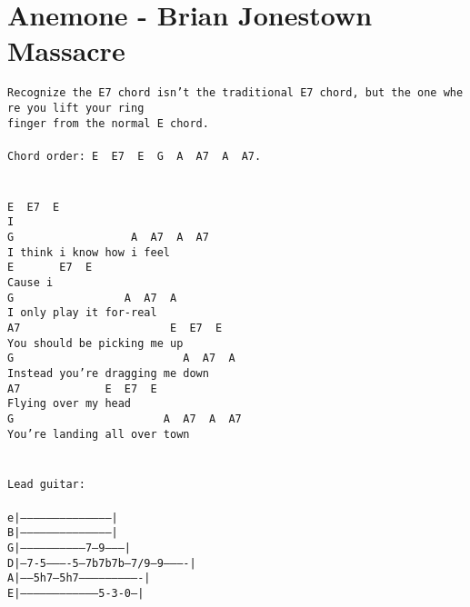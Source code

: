 \newpage
\section{Anemone - Brian Jonestown Massacre}
\label{Anemone - Brian Jonestown Massacre}
\texttt{Recognize\ the\ E7\ chord\ isn't\ the\ traditional\ E7\ chord,\ but\ the\ one\ where\ you\ lift\ your\ ring\ \\
finger\ from\ the\ normal\ E\ chord.\\
\\
Chord\ order:\ E\ \ E7\ \ E\ \ G\ \ A\ \ A7\ \ A\ \ A7.\\
\\
\\
E\ \ E7\ \ E\\
I\\
G\ \ \ \ \ \ \ \ \ \ \ \ \ \ \ \ \ \ A\ \ A7\ \ A\ \ A7\\
I\ think\ i\ know\ how\ i\ feel\\
E\ \ \ \ \ \ \ E7\ \ E\\
Cause\ i\\
G\ \ \ \ \ \ \ \ \ \ \ \ \ \ \ \ \ A\ \ A7\ \ A\\
I\ only\ play\ it\ for-real\\
A7\ \ \ \ \ \ \ \ \ \ \ \ \ \ \ \ \ \ \ \ \ \ \ E\ \ E7\ \ E\\
You\ should\ be\ picking\ me\ up\\
G\ \ \ \ \ \ \ \ \ \ \ \ \ \ \ \ \ \ \ \ \ \ \ \ \ \ A\ \ A7\ \ A\\
Instead\ you're\ dragging\ me\ down\\
A7\ \ \ \ \ \ \ \ \ \ \ \ \ E\ \ E7\ \ E\\
Flying\ over\ my\ head\\
G\ \ \ \ \ \ \ \ \ \ \ \ \ \ \ \ \ \ \ \ \ \ \ A\ \ A7\ \ A\ \ A7\\
You're\ landing\ all\ over\ town\\
\\
\\
Lead\ guitar:\\
\\
e|------------------------------------------|\\
B|------------------------------------------|\\
G|------------------------------7--9--------|\\
D|--7-5----------5--7b7b7b--7/9--9----------|\\
A|------5h7--5h7----------------------------|\\
E|-----------------------------------5-3-0--|\\
}
